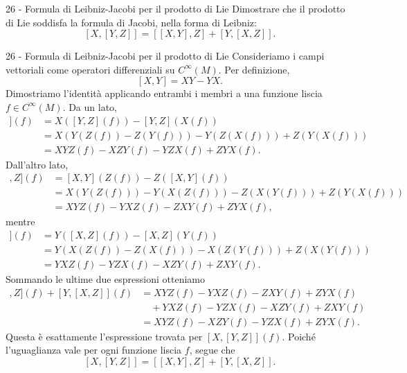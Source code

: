 \documentclass[a4paper]{article}
\begin{document}
\pagebreak

\begin{snippetexercise}{26 - Formula di Leibniz-Jacobi per il prodotto di Lie}
    Dimostrare che il prodotto di Lie soddisfa la formula di Jacobi,
    nella forma di Leibniz:
    \[
        [X,[Y,Z]]
        =
        [[X,Y],Z]+[Y,[X,Z]].
    \]
\end{snippetexercise}

\begin{snippetsolution}{26 - Formula di Leibniz-Jacobi per il prodotto di Lie}
    Consideriamo i campi vettoriali come operatori differenziali su \(C^\infty(M)\). Per definizione,
    \[
        [X,Y]=XY-YX.
    \]
    Dimostriamo l'identità applicando entrambi i membri a una funzione liscia \(f\in C^\infty(M)\). Da un lato,
    \begin{align*}
        [X,[Y,Z]](f)
        &=
        X([Y,Z](f))-[Y,Z](X(f))\\
        &=
        X(Y(Z(f))-Z(Y(f)))-Y(Z(X(f)))+Z(Y(X(f)))\\
        &=
        XYZ(f)-XZY(f)-YZX(f)+ZYX(f).
    \end{align*}
    Dall'altro lato,
    \begin{align*}
        [[X,Y],Z](f)
        &=
        [X,Y](Z(f))-Z([X,Y](f))\\
        &=
        X(Y(Z(f)))-Y(X(Z(f)))-Z(X(Y(f)))+Z(Y(X(f)))\\
        &=
        XYZ(f)-YXZ(f)-ZXY(f)+ZYX(f),
    \end{align*}
    mentre
    \begin{align*}
        [Y,[X,Z]](f)
        &=
        Y([X,Z](f))-[X,Z](Y(f))\\
        &=
        Y(X(Z(f))-Z(X(f)))-X(Z(Y(f)))+Z(X(Y(f)))\\
        &=
        YXZ(f)-YZX(f)-XZY(f)+ZXY(f).
    \end{align*}
    Sommando le ultime due espressioni otteniamo
    \begin{align*}
        [[X,Y],Z](f)+[Y,[X,Z]](f)
        &=
        XYZ(f)-YXZ(f)-ZXY(f)+ZYX(f)\\
        &\quad +YXZ(f)-YZX(f)-XZY(f)+ZXY(f)\\
        &=
        XYZ(f)-XZY(f)-YZX(f)+ZYX(f).
    \end{align*}
    Questa è esattamente l'espressione trovata per \([X,[Y,Z]](f)\). Poiché l'uguaglianza vale per ogni funzione liscia \(f\), segue che
    \[
        [X,[Y,Z]]
        =
        [[X,Y],Z]+[Y,[X,Z]].
    \]
\end{snippetsolution}
\end{document}

